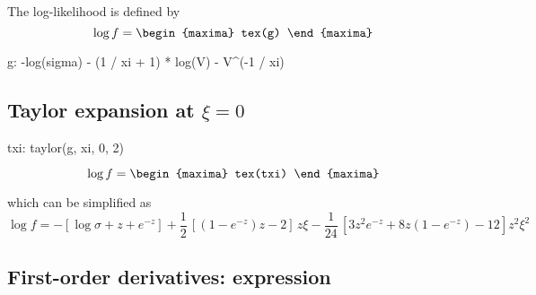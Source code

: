 The log-likelihood is defined by
\[
\log f = 
\begin{maxima}
  tex(g)
\end{maxima}
\]

\begin{maxima}
  g: -log(sigma) - (1 / xi + 1) * log(V) - V^(-1 / xi)
\end{maxima}




\subsection{Taylor expansion at $\xi = 0$}

\begin{maxima}
  txi: taylor(g, xi, 0, 2)
\end{maxima}
{\color{MonVertF}
\[
  \log f = 
  \begin{maxima}
    tex(txi)
  \end{maxima}
\]
}

which can be simplified as
{\color{red}
$$
\log f = -\left[ \log \sigma + z + e^{-z} \right] + \frac{1}{2}\,
\left[ (1 -  e^{-z}) z -2  \right]\,z \xi - \frac{1}{24} \,
\left[ 3 z^2 e^{-z} + 8 z (1 - e^{-z}) - 12 \right] z^2 \xi^2
$$}

\subsection{First-order derivatives: expression}

